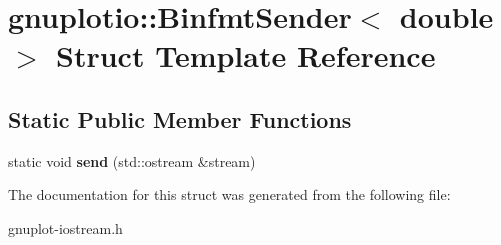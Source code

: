 \hypertarget{structgnuplotio_1_1BinfmtSender_3_01double_01_4}{}\section{gnuplotio\+:\+:Binfmt\+Sender$<$ double $>$ Struct Template Reference}
\label{structgnuplotio_1_1BinfmtSender_3_01double_01_4}
\subsection*{Static Public Member Functions}
\begin{DoxyCompactItemize}
\item 
\mbox{\label{structgnuplotio_1_1BinfmtSender_3_01double_01_4_a455b75492a6a86398374d14a2bfc7238}} 
static void {\bfseries send} (std\+::ostream \&stream)
\end{DoxyCompactItemize}


The documentation for this struct was generated from the following file\+:\begin{DoxyCompactItemize}
\item 
gnuplot-\/iostream.\+h\end{DoxyCompactItemize}
